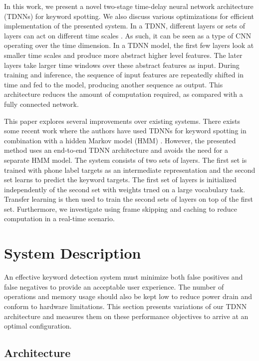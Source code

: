 \documentclass{article}
\begin{document}
In this work, we present a novel two-stage time-delay neural network architecture (TDNNs) for keyword spotting. We also discuss various optimizations for efficient implementation of the presented system. In a TDNN, different layers or sets of layers can act on different time scales \cite{Waibel89}. As such, it can be seen as a type of CNN \cite{Lecun95} operating over the time dimension. In a TDNN model, the first few layers look at smaller time scales and produce more abstract higher level features. The later layers take larger time windows over these abstract features as input. During training and inference, the sequence of input features are repeatedly shifted in time and fed to the model, producing another sequence as output. This architecture reduces the amount of computation required, as compared with a fully connected network.

This paper explores several improvements over existing systems.  There exists some recent work where the authors have used TDNNs for keyword spotting in combination with a hidden Markov model (HMM) \cite{Sun17}.  However, the presented method uses an end-to-end TDNN architecture and avoids the need for a separate HMM model. The system consists of two sets of layers. The first set is trained with phone label targets as an intermediate representation and the second set learns to predict the keyword targets.  The first set of layers is initialized independently of the second set with weights trned on a large vocabulary task. Transfer learning is then used to train the second sets of layers on top of the first set. Furthermore, we investigate using frame skipping and caching to reduce computation in a real-time scenario. 

\section{System Description}
\label{sec:model}

An effective keyword detection system must minimize both false positives and false negatives to provide an acceptable user experience. The number of operations and memory usage should also be kept low to reduce power drain and conform to hardware limitations. This section presents variations of our TDNN architecture and measures them on these performance objectives to arrive at an optimal configuration.

\subsection{Architecture}
\label{ssec:architecture}
\end{document}

